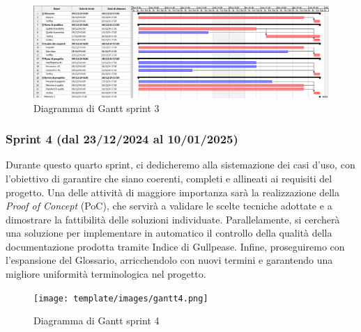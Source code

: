         \begin{figure}[h!]
            \centering
            \includegraphics[scale = 0.3]{template/images/gantt3.png}
            \caption{Diagramma di Gantt sprint 3}
            \label{fig:3.3} %
        \end{figure}

        \subsubsection{Sprint 4 (dal 23/12/2024 al 10/01/2025)}
        Durante questo quarto sprint, ci dedicheremo alla sistemazione dei casi d'uso, con l'obiettivo di garantire che siano coerenti, completi e allineati ai requisiti del progetto. 
        Una delle attività di maggiore importanza sarà la realizzazione della \textit{Proof of Concept} (PoC), che servirà a validare le scelte tecniche adottate e a dimostrare la fattibilità delle soluzioni individuate. 
        Parallelamente, si cercherà una soluzione per implementare in automatico il controllo della qualità della documentazione prodotta tramite Indice di Gullpease. 
        Infine, proseguiremo con l'espansione del Glossario, arricchendolo con nuovi termini e garantendo una migliore uniformità terminologica nel progetto.

        \begin{figure}[h!]
            \centering
            \texttt{[image: template/images/gantt4.png]}
            \caption{Diagramma di Gantt sprint 4}
            \label{fig:3.4} %
        \end{figure}

 
